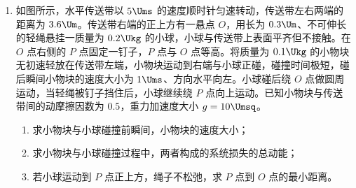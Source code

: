 \documentclass[\gkver]{gaokaozhenti}
\begin{document}
\begin{enumerate}
{此过程中容器内气体吸收的热量 $ Q = \Delta U + W = \frac{1}{5} (p_0 S + mg) h + \frac{1}{5} CT_0 $
}
\item
如图所示，水平传送带以 $ 5 \Ums $ 的速度顺时针匀速转动，传送带左右两端的距离为 $ 3.6 \Um $。传送带右端的正上方有一悬点 $ O $，用长为 $ 0.3 \Um $、不可伸长的轻绳悬挂一质量为 $ 0.2 \Ukg $ 的小球，小球与传送带上表面平齐但不接触。在 $ O $ 点右侧的 $ P $ 点固定一钉子，$ P $ 点与 $ O $ 点等高。将质量为 $ 0.1 \Ukg $ 的小物块无初速轻放在传送带左端，小物块运动到右端与小球正碰，碰撞时间极短，碰后瞬间小物块的速度大小为 $ 1 \Ums $、方向水平向左。小球碰后绕 $ O $ 点做圆周运动，当轻绳被钉子挡住后，小球继续绕 $ P $ 点向上运动。已知小物块与传送带间的动摩擦因数为 $ 0.5 $，重力加速度大小 $ g =10 \Umsq $。
\begin{enumerate}
	\item 
	求小物块与小球碰撞前瞬间，小物块的速度大小；
	
	\item
	求小物块与小球碰撞过程中，两者构成的系统损失的总动能；
	
	\item
	若小球运动到 $ P $ 点正上方，绳子不松弛，求 $ P $ 点到 $ O $ 点的最小距离。
\end{enumerate}
\jdanswer{
\begin{enumerate}
	\item 
	$ 5 \Ums $
	
	\item
	$ 0.3 \UJ $
	
	\item
	$ 0.2 \Um $
\end{enumerate}
}

\end{enumerate}
\end{document}
